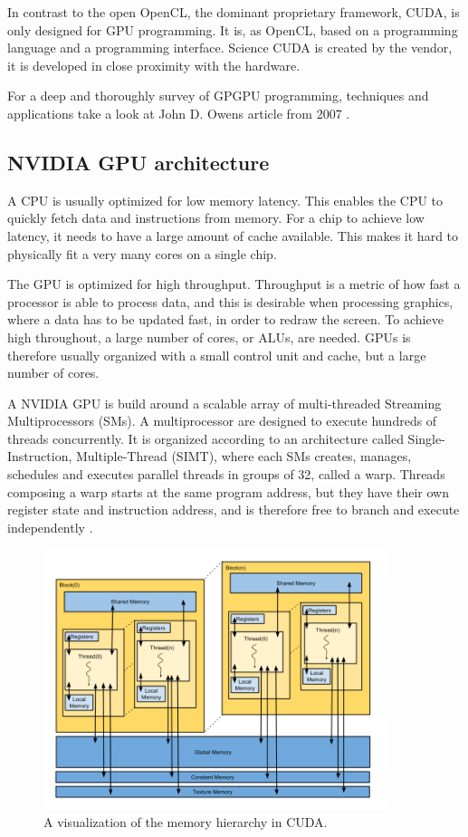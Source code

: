 In contrast to the open OpenCL, the dominant proprietary framework, CUDA\@, is only designed for GPU programming. It is, as OpenCL, based on a programming language and a programming interface. Science CUDA is created by the vendor, it is developed in close proximity with the hardware.

For a deep and thoroughly survey of GPGPU programming, techniques and applications take a look at John D. Owens article from 2007 \citep{Owens:2007:ASO}.

\subsection{NVIDIA GPU architecture} %
\label{ssub:nvidia_gpu_architecture}

A CPU is usually optimized for low memory latency. This enables the CPU to quickly fetch data and instructions from memory. For a chip to achieve low latency, it needs to have a large amount of cache available. This makes it hard to physically fit a very many cores on a single chip.

The GPU is optimized for high throughput. Throughput is a metric of how fast a processor is able to process data, and this is desirable when processing graphics, where a data has to be updated fast, in order to redraw the screen. To achieve high throughout, a large number of cores, or ALUs, are needed. GPUs is therefore usually organized with a small control unit and cache, but a large number of cores.

A NVIDIA GPU is build around a scalable array of multi-threaded Streaming Multiprocessors (SMs). A multiprocessor are designed to execute hundreds of threads concurrently. It is organized according to an architecture called Single-Instruction, Multiple-Thread (SIMT), where each SMs creates, manages, schedules and executes parallel threads in groups of 32, called a warp. Threads composing a warp starts at the same program address, but they have their own register state and instruction address, and is therefore free to branch and execute independently \citep{cuda_programming_guide}.

\begin{figure}[ht!]
    \centering
    \includegraphics[width=100mm]{../gfx/memory_hierarchy.png}
    \caption{A visualization of the memory hierarchy in CUDA.}
    \label{fig:memory_hierachy}
\end{figure}

